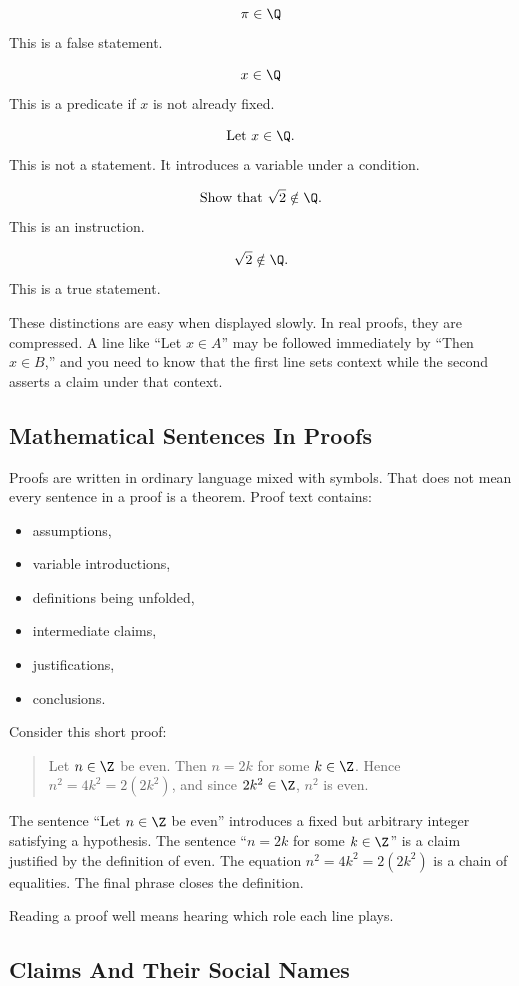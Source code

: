 \[
\pi\in\Q
\]
This is a false statement.

\[
x\in\Q
\]
This is a predicate if $x$ is not already fixed.

\[
\text{Let }x\in\Q.
\]
This is not a statement. It introduces a variable under a condition.

\[
\text{Show that }\sqrt2\notin\Q.
\]
This is an instruction.

\[
\sqrt2\notin\Q.
\]
This is a true statement.

These distinctions are easy when displayed slowly. In real proofs, they are compressed. A line like ``Let $x\in A$'' may be followed immediately by ``Then $x\in B$,'' and you need to know that the first line sets context while the second asserts a claim under that context.

\subsection{Mathematical Sentences In Proofs}

Proofs are written in ordinary language mixed with symbols. That does not mean every sentence in a proof is a theorem. Proof text contains:

\begin{itemize}
\item assumptions,
\item variable introductions,
\item definitions being unfolded,
\item intermediate claims,
\item justifications,
\item conclusions.
\end{itemize}

Consider this short proof:

\begin{quote}
Let $n\in\Z$ be even. Then $n=2k$ for some $k\in\Z$. Hence $n^2=4k^2=2(2k^2)$, and since $2k^2\in\Z$, $n^2$ is even.
\end{quote}

The sentence ``Let $n\in\Z$ be even'' introduces a fixed but arbitrary integer satisfying a hypothesis. The sentence ``$n=2k$ for some $k\in\Z$'' is a claim justified by the definition of even. The equation $n^2=4k^2=2(2k^2)$ is a chain of equalities. The final phrase closes the definition.

Reading a proof well means hearing which role each line plays.

\subsection{Claims And Their Social Names}

